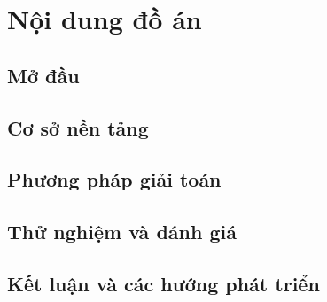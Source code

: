 \section{Nội dung đồ án}
\subsection{Mở đầu}

\subsection{Cơ sở nền tảng}

\subsection{Phương pháp giải toán}

\subsection{Thử nghiệm và đánh giá}

\subsection{Kết luận và các hướng phát triển}



